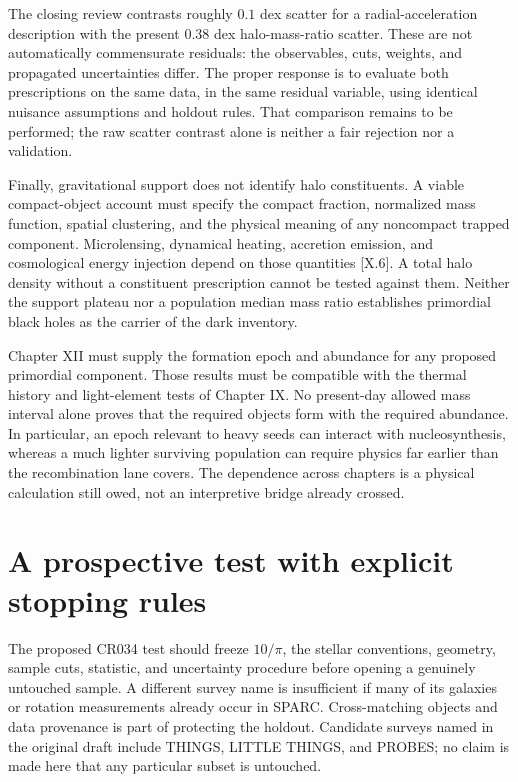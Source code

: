 The closing review contrasts roughly $0.1$ dex scatter for a radial-acceleration description with the present $0.38$ dex halo-mass-ratio scatter. These are not automatically commensurate residuals: the observables, cuts, weights, and propagated uncertainties differ. The proper response is to evaluate both prescriptions on the same data, in the same residual variable, using identical nuisance assumptions and holdout rules. That comparison remains to be performed; the raw scatter contrast alone is neither a fair rejection nor a validation.

Finally, gravitational support does not identify halo constituents. A viable compact-object account must specify the compact fraction, normalized mass function, spatial clustering, and the physical meaning of any noncompact trapped component. Microlensing, dynamical heating, accretion emission, and cosmological energy injection depend on those quantities [X.6]. A total halo density without a constituent prescription cannot be tested against them. Neither the support plateau nor a population median mass ratio establishes primordial black holes as the carrier of the dark inventory.

Chapter XII must supply the formation epoch and abundance for any proposed primordial component. Those results must be compatible with the thermal history and light-element tests of Chapter IX. No present-day allowed mass interval alone proves that the required objects form with the required abundance. In particular, an epoch relevant to heavy seeds can interact with nucleosynthesis, whereas a much lighter surviving population can require physics far earlier than the recombination lane covers. The dependence across chapters is a physical calculation still owed, not an interpretive bridge already crossed.

\section{A prospective test with explicit stopping rules}

The proposed CR034 test should freeze $10/\pi$, the stellar conventions, geometry, sample cuts, statistic, and uncertainty procedure before opening a genuinely untouched sample. A different survey name is insufficient if many of its galaxies or rotation measurements already occur in SPARC. Cross-matching objects and data provenance is part of protecting the holdout. Candidate surveys named in the original draft include THINGS, LITTLE THINGS, and PROBES; no claim is made here that any particular subset is untouched.

